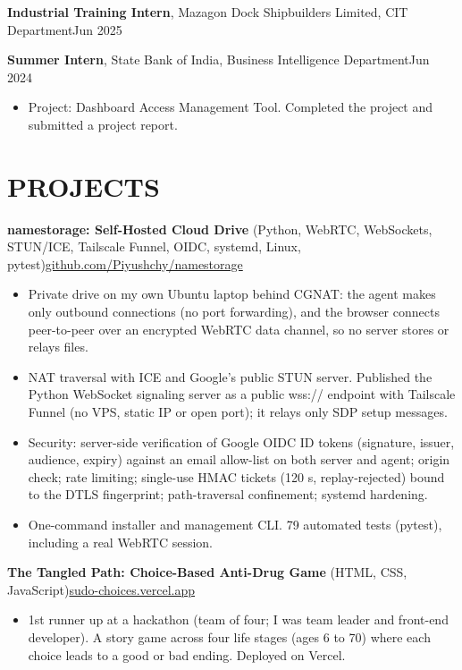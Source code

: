 \documentclass[10pt,letterpaper]{article}
\begin{document}
\vspace{1pt}
\noindent\textbf{Industrial Training Intern}, Mazagon Dock Shipbuilders Limited, CIT Department\hfill Jun 2025\par

\vspace{1pt}
\noindent\textbf{Summer Intern}, State Bank of India, Business Intelligence Department\hfill Jun 2024\par
\begin{itemize}
  \item Project: Dashboard Access Management Tool. Completed the project and submitted a project report.
\end{itemize}

\section*{PROJECTS}
\noindent\textbf{namestorage: Self-Hosted Cloud Drive} (Python, WebRTC, WebSockets, STUN/ICE, Tailscale Funnel, OIDC, systemd, Linux, pytest)\hfill \href{https://github.com/Piyushchy/namestorage}{github.com/Piyushchy/namestorage}\par
\begin{itemize}
  \item Private drive on my own Ubuntu laptop behind CGNAT: the agent makes only outbound connections (no port forwarding), and the browser connects peer-to-peer over an encrypted WebRTC data channel, so no server stores or relays files.
  \item NAT traversal with ICE and Google's public STUN server. Published the Python WebSocket signaling server as a public wss:// endpoint with Tailscale Funnel (no VPS, static IP or open port); it relays only SDP setup messages.
  \item Security: server-side verification of Google OIDC ID tokens (signature, issuer, audience, expiry) against an email allow-list on both server and agent; origin check; rate limiting; single-use HMAC tickets (120 s, replay-rejected) bound to the DTLS fingerprint; path-traversal confinement; systemd hardening.
  \item One-command installer and management CLI. 79 automated tests (pytest), including a real WebRTC session.
\end{itemize}

\vspace{1pt}
\noindent\textbf{The Tangled Path: Choice-Based Anti-Drug Game} (HTML, CSS, JavaScript)\hfill \href{https://sudo-choices.vercel.app/}{sudo-choices.vercel.app}\par
\begin{itemize}
  \item 1st runner up at a hackathon (team of four; I was team leader and front-end developer). A story game across four life stages (ages 6 to 70) where each choice leads to a good or bad ending. Deployed on Vercel.
\end{itemize}
\end{document}

